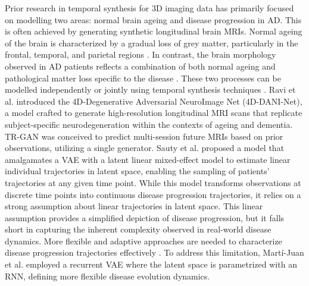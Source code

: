 Prior research in temporal synthesis for 3D imaging data has primarily focused on modelling two areas: normal brain ageing and disease progression in AD. This is often achieved by generating synthetic longitudinal brain MRIs. Normal ageing of the brain is characterized by a gradual loss of grey matter, particularly in the frontal, temporal, and parietal regions \cite{lorenzi2015disentangling}. In contrast, the brain morphology observed in AD patients reflects a combination of both normal ageing and pathological matter loss specific to the disease \cite{lorenzi2015disentangling}. These two processes can be modelled independently or jointly using temporal synthesis techniques \cite{sivera2019model}. Ravi et al. \cite{ravi2022degenerative} introduced the 4D-Degenerative Adversarial NeuroImage Net (4D-DANI-Net), a model crafted to generate high-resolution longitudinal MRI scans that replicate subject-specific neurodegeneration within the contexts of ageing and dementia. TR-GAN \cite{fan2022tr} was conceived to predict multi-session future MRIs based on prior observations, utilizing a single generator. Sauty et al. \cite{sauty2022progression} proposed a model that amalgamates a VAE with a latent linear mixed-effect model to estimate linear individual trajectories in latent space, enabling the sampling of patients’ trajectories at any given time point. While this model transforms observations at discrete time points into continuous disease progression trajectories, it relies on a strong assumption about linear trajectories in latent space. This linear assumption provides a simplified depiction of disease progression, but it falls short in capturing the inherent complexity observed in real-world disease dynamics. More flexible and adaptive approaches are needed to characterize disease progression trajectories effectively \cite{kim2021longitudinal}. To address this limitation, Martí-Juan et al. \cite{marti2023mc} employed a recurrent VAE where the latent space is parametrized with an RNN, defining more flexible disease evolution dynamics.


